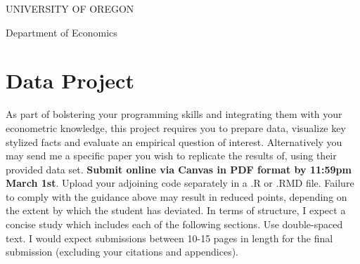 \documentclass[addpoints, 12pt]{exam}
\begin{document}
	
	\singlespacing
	
	\centerline{UNIVERSITY OF OREGON}
	\centerline{Department of Economics}
	
	\bigskip
	
	\bigskip
	


\section*{Data Project}

\onehalfspacing

\bigskip

As part of bolstering your programming skills and integrating them with your econometric knowledge, this project requires you to prepare data, visualize key stylized facts and evaluate an empirical question of interest. 
Alternatively you may send me a specific paper you wish to replicate the results of, using their provided data set. 
{\bf Submit online via Canvas in PDF format by 11:59pm March 1st}. Upload your adjoining code separately in a .R or .RMD file. Failure to comply with the guidance above may result in reduced points, depending on the extent by which the student has deviated. 
In terms of structure, I expect a concise study which includes each of the following sections. 
Use double-spaced text. I would expect submissions between 10-15 pages in length for the final submission (excluding your citations and appendices).
\end{document}
